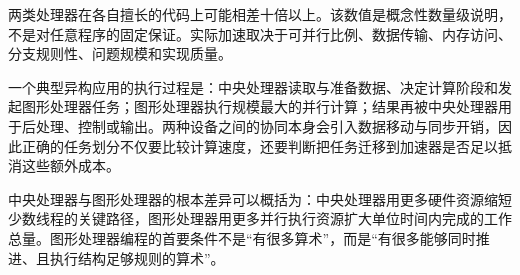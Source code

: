 两类处理器在各自擅长的代码上可能相差十倍以上。该数值是概念性数量级说明，不是对任意程序的固定保证。实际加速取决于可并行比例、数据传输、内存访问、分支规则性、问题规模和实现质量。

一个典型异构应用的执行过程是：中央处理器读取与准备数据、决定计算阶段和发起图形处理器任务；图形处理器执行规模最大的并行计算；结果再被中央处理器用于后处理、控制或输出。两种设备之间的协同本身会引入数据移动与同步开销，因此正确的任务划分不仅要比较计算速度，还要判断把任务迁移到加速器是否足以抵消这些额外成本。

\begin{keybox}
中央处理器与图形处理器的根本差异可以概括为：中央处理器用更多硬件资源缩短少数线程的关键路径，图形处理器用更多并行执行资源扩大单位时间内完成的工作总量。图形处理器编程的首要条件不是“有很多算术”，而是“有很多能够同时推进、且执行结构足够规则的算术”。
\end{keybox}
